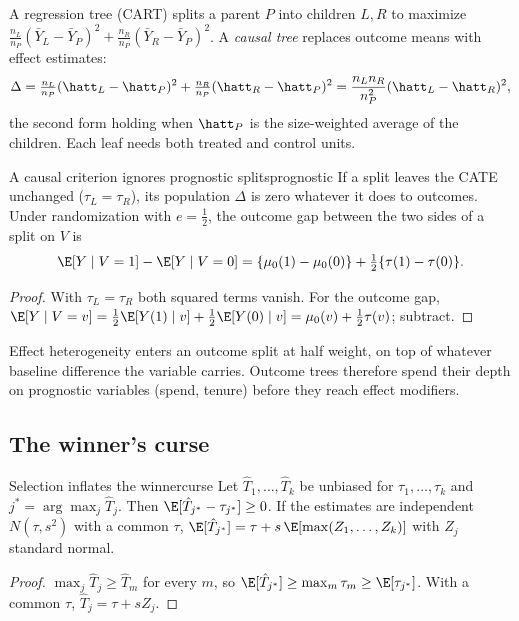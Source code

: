 \documentclass[11pt]{article}
\begin{document}
A regression tree (CART) splits a parent $P$ into children $L, R$ to maximize
$\tfrac{n_L}{n_P}(\bar Y_L - \bar Y_P)^2 + \tfrac{n_R}{n_P}(\bar Y_R - \bar Y_P)^2$. A \emph{causal tree} replaces outcome
means with effect estimates:
\[
  \Delta = \tfrac{n_L}{n_P}(\hatt_L - \hatt_P)^2 + \tfrac{n_R}{n_P}(\hatt_R - \hatt_P)^2
  = \frac{n_L n_R}{n_P^2}(\hatt_L - \hatt_R)^2 ,
\]
the second form holding when $\hatt_P$ is the size-weighted average of the children. Each leaf needs both
treated and control units.

\begin{prop}{A causal criterion ignores prognostic splits}{prognostic}
If a split leaves the CATE unchanged ($\tau_L = \tau_R$), its population $\Delta$ is zero whatever it does to
outcomes. Under randomization with $e = \tfrac12$, the outcome gap between the two sides of a split on $V$ is
\[
  \E[Y \mid V=1] - \E[Y \mid V=0] = \{\mu_0(1) - \mu_0(0)\} + \tfrac12\{\tau(1) - \tau(0)\}.
\]
\end{prop}
\begin{proof}
With $\tau_L = \tau_R$ both squared terms vanish. For the outcome gap,
$\E[Y \mid V=v] = \tfrac12\E[Y(1) \mid v] + \tfrac12\E[Y(0) \mid v] = \mu_0(v) + \tfrac12\tau(v)$; subtract.
\end{proof}

Effect heterogeneity enters an outcome split at half weight, on top of whatever baseline difference the variable
carries. Outcome trees therefore spend their depth on prognostic variables (spend, tenure) before they reach
effect modifiers.

\subsection{The winner's curse}

\begin{prop}{Selection inflates the winner}{curse}
Let $\hat T_1, \dots, \hat T_k$ be unbiased for $\tau_1, \dots, \tau_k$ and $j^\ast = \arg\max_j \hat T_j$. Then
$\E[\hat T_{j^\ast} - \tau_{j^\ast}] \ge 0$. If the estimates are independent $N(\tau, s^2)$ with a common $\tau$,
$\E[\hat T_{j^\ast}] = \tau + s\,\E[\max(Z_1, \dots, Z_k)]$ with $Z_j$ standard normal.
\end{prop}
\begin{proof}
$\max_j \hat T_j \ge \hat T_m$ for every $m$, so $\E[\hat T_{j^\ast}] \ge \max_m \tau_m \ge \E[\tau_{j^\ast}]$. With a common
$\tau$, $\hat T_j = \tau + sZ_j$.
\end{proof}
\end{document}
